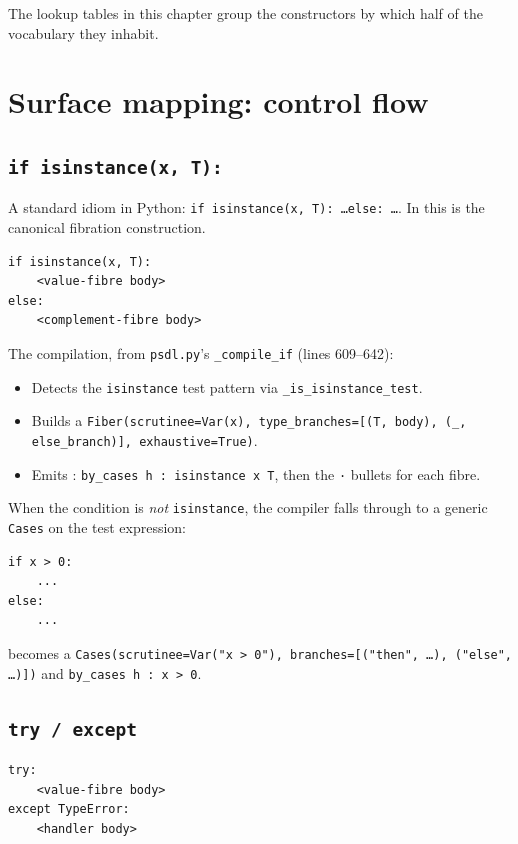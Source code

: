 The lookup tables in this chapter group the constructors by which
half of the vocabulary they inhabit.

\section{Surface mapping: control flow}
\label{sec:psdl-control}

\subsection{\texttt{if isinstance(x, T):}}

A standard idiom in Python: \texttt{if isinstance(x, T): \dots else:
\dots}.  In \PSDL{} this is the canonical fibration construction.

\begin{lstlisting}[language=psdl]
if isinstance(x, T):
    <value-fibre body>
else:
    <complement-fibre body>
\end{lstlisting}

The compilation, from \texttt{psdl.py}'s \texttt{\_compile\_if}
(lines 609--642):

\begin{itemize}[leftmargin=1.7em]
  \item Detects the \texttt{isinstance} test pattern via
    \texttt{\_is\_isinstance\_test}.
  \item Builds a \texttt{Fiber(scrutinee=Var(x), type\_branches=[(T,
    body), (\_, else\_branch)], exhaustive=True)}.
  \item Emits \Lean: \verb|by_cases h : isinstance x T|, then the
    \texttt{·} bullets for each fibre.
\end{itemize}

When the condition is \emph{not} \texttt{isinstance}, the compiler
falls through to a generic \texttt{Cases} on the test expression:

\begin{lstlisting}[language=psdl]
if x > 0:
    ...
else:
    ...
\end{lstlisting}

becomes a \texttt{Cases(scrutinee=Var("x > 0"), branches=[("then",
\dots), ("else", \dots)])} and \Lean{} \verb|by_cases h : x > 0|.

\subsection{\texttt{try / except}}

\begin{lstlisting}[language=psdl]
try:
    <value-fibre body>
except TypeError:
    <handler body>
\end{lstlisting}

